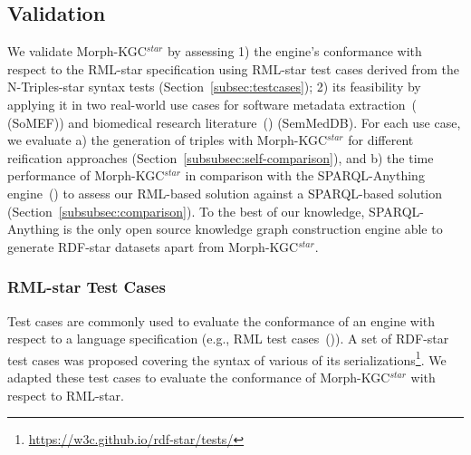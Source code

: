 \subsection{Validation}
\label{sec:chp4_validation}

We validate \mbox{Morph-KGC$^{star}$} by assessing
1) the engine's conformance with respect to the \mbox{RML-star} specification using \mbox{RML-star} test cases derived from the N-Triples-star syntax tests (Section~\ref{subsec:testcases});
2) its feasibility by applying it in two real-world use cases for software metadata extraction~(\cite{kelley2021framework} (SoMEF)) and biomedical research literature~(\cite{SemMedDB}) (SemMedDB). 
For each use case, we evaluate
a) the generation of triples with \mbox{Morph-KGC$^{star}$} for different reification approaches (Section~\ref{subsubsec:self-comparison}), and 
b) the time performance of \mbox{Morph-KGC$^{star}$} in comparison with the SPARQL-Anything engine~(\cite{daga2021facade,sparql-anything}) to assess our RML-based solution against a SPARQL-based solution (Section~\ref{subsubsec:comparison}).
To the best of our knowledge, SPARQL-Anything is the only open source knowledge graph construction engine able to generate \mbox{RDF-star} datasets apart from \mbox{Morph-KGC$^{star}$}. 


\subsubsection{RML-star Test Cases}

Test cases are commonly used %
to evaluate the conformance of an engine with respect to a language specification (e.g., RML test cases~(\cite{heyvaert2019conformance})). 
A set of \mbox{RDF-star} test cases was proposed
covering the syntax of various of its serializations\footnote{\url{https://w3c.github.io/rdf-star/tests/}}.
We adapted these test cases
to evaluate the conformance of \mbox{Morph-KGC$^{star}$}
with respect to \mbox{RML-star}.

